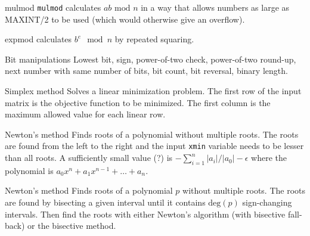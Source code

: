 \begin{algorithm}{mulmod}
\desc
{\tt mulmod} calculates $ab\mbox{ mod } n$ in a way that
allows numbers as large as MAXINT/2 to be used (which would otherwise give
an overflow).
\end{algorithm}

\begin{algorithm}{expmod}
 calculates $b^e\mod n$ by repeated squaring.
\end{algorithm}

\begin{algorithm}{Bit manipulations}
\desc
Lowest bit, sign, power-of-two check, power-of-two round-up,
next number with same number of bits, bit count, bit reversal,
binary length.
\end{algorithm}


\begin{algorithm}{Simplex method}
\desc
Solves a linear minimization problem. The first row of the
input matrix is the objective function to be minimized. The
first column is the maximum allowed value for each linear row.
\end{algorithm}

\begin{algorithm}{Newton's method}
\desc
Finds roots of a polynomial without multiple roots. The roots are found from
the left to the right and the input {\tt xmin} variable needs to be lesser than
all roots. A sufficiently small value (?) is
$-\sum_{i=1}^n |a_i|/|a_0|-\epsilon$ where the polynomial is
$a_0 x^n + a_1 x^{n-1} + \dots + a_n$.
\end{algorithm}

\begin{algorithm}{Newton's method}
\desc
Finds roots of a polynomial $p$ without multiple roots. The roots are found by
bisecting a given interval until it contains $\mathrm{deg}(p)$ sign-changing
intervals. Then find the roots with either Newton's algorithm (with bisective
fall-back) or the bisective method.
\end{algorithm}

